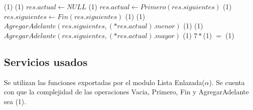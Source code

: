 {   }
{}
{\bigo(1)}
{                                              \comment \bigo(1)
        \State $res.actual \gets NULL$                                          \comment \bigo(1)
    \Else
        \State $res.actual \gets Primero(res.siguientes)$                       \comment \bigo(1)
        \State $res.siguientes \gets Fin(res.siguientes)$                       \comment \bigo(1)
                                           \comment \bigo(1)
            \State $AgregarAdelante(res.siguientes, (*res.actual).menor)$       \comment \bigo(1)
        \EndIf
                                           \comment \bigo(1)
            \State $AgregarAdelante(res.siguientes, (*res.actual).mayor)$       \comment \bigo(1)
        \EndIf 
    \EndIf
}
{   $7*$\bigo(1) $=$ \bigo(1)}


 
    
\subsection{Servicios usados}

Se utilizan las funciones exportadas por el modulo Lista Enlazada($\alpha$).
Se cuenta con que la complejidad de las operaciones Vacia, Primero, Fin y AgregarAdelante
sea \bigo(1).
